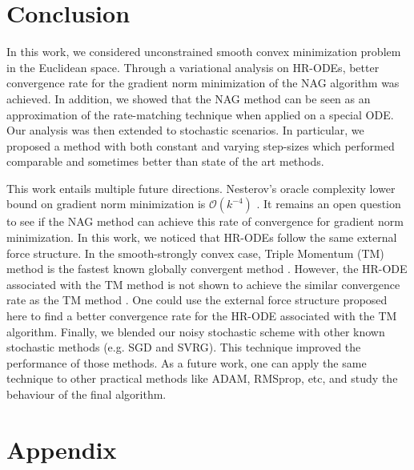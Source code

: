 \documentclass{article}
\theoremstyle{plain}
\theoremstyle{definition}
\theoremstyle{remark}
\begin{document}
\section{Conclusion}\label{sec_conclusion}
In this work, we considered unconstrained smooth convex minimization problem in the Euclidean space. Through a variational analysis on HR-ODEs, better convergence rate for the gradient norm minimization of the NAG algorithm was achieved. In addition, we showed that the NAG method can be seen as an approximation of the rate-matching technique when applied on a special ODE. Our analysis was then extended to stochastic scenarios. In particular, we proposed a method with both constant and varying step-sizes which performed comparable and sometimes better than state of the art methods.\par
This work entails multiple future directions. Nesterov's oracle complexity lower bound on gradient norm minimization is \(\mathcal O({k^{-4}})\) \citep{nesterov2003introductory}. It remains an open question to see if the NAG method can achieve this rate of convergence for gradient norm minimization. In this work, we noticed that HR-ODEs follow the same external force structure. 
In the smooth-strongly convex case, Triple Momentum (TM) method is the fastest known globally convergent method \citep{7967721}. However, the HR-ODE associated with the TM method is not shown to achieve the similar convergence rate as the TM method \citep{DBLP:conf/cdc/SunGK20}. One could use the external force structure proposed here to find a better convergence rate for the HR-ODE associated with the TM algorithm. 
Finally, we blended our noisy stochastic scheme with other known stochastic methods (e.g. SGD and SVRG). This technique improved the performance of those methods. As a future work, one can apply the same technique to other practical methods like ADAM, RMSprop, etc, and study the behaviour of the final algorithm.









\newpage



\section{Appendix}
\end{document}
